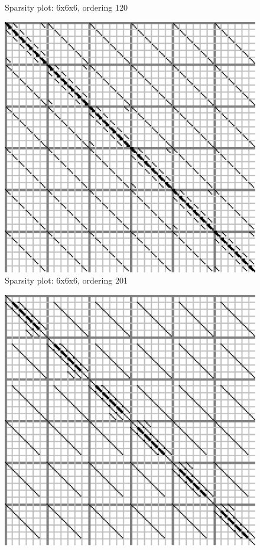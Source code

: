 \documentclass[10pt]{article}
\begin{document}
\begin{multicols}{2}
\begin{center}
\begin{minipage}[t]{.5\textwidth}
\begin{figure}[H]
	\caption{Sparsity plot: 6x6x6, ordering 120 }
\end{figure}
\vspace{\spmgin}
\begin{figure}[H]
	\centering
	\includegraphics[width=\spwidth]{../img/sparsity/int_small_6x6x6_201.eps}
	\caption{Sparsity plot: 6x6x6, ordering 201 }
\end{figure}
\vspace{\spmgin}
\begin{figure}[H]
	\centering
	\includegraphics[width=\spwidth]{../img/sparsity/int_small_6x6x6_210.eps}

\end{figure}
\end{minipage}
\end{center}
\end{multicols}
\end{document}
